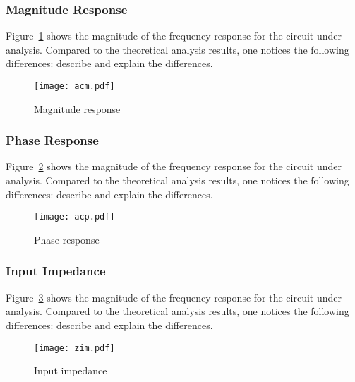 \subsubsection{Magnitude Response}

Figure~\ref{fig:acm} shows the magnitude of the frequency response for the
circuit under analysis. Compared to the theoretical analysis results, one
notices the following differences: describe and explain the differences.

\begin{figure}[h]
	\centering
	\texttt{[image: acm.pdf]}
	\caption{Magnitude response}
\label{fig:acm}
\end{figure}


\subsubsection{Phase Response}

Figure~\ref{fig:acp} shows the magnitude of the frequency response for the
circuit under analysis. Compared to the theoretical analysis results, one
notices the following differences: describe and explain the differences.

\begin{figure}[h]
	\centering
	\texttt{[image: acp.pdf]}
	\caption{Phase response}
\label{fig:acp}
\end{figure}


\subsubsection{Input Impedance}

Figure~\ref{fig:zim} shows the magnitude of the frequency response for the
circuit under analysis. Compared to the theoretical analysis results, one
notices the following differences: describe and explain the differences.

\begin{figure}[h]
	\centering
	\texttt{[image: zim.pdf]}
	\caption{Input impedance}
\label{fig:zim}
\end{figure}

